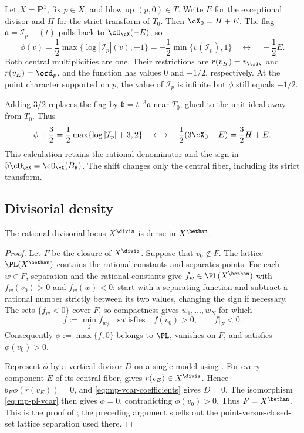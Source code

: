 \begin{example}\label{ex:mp-pl-flag-denominator}
Let $X=\mathbf P^1$, fix $p\in X$, and blow up
$(p,0)\in T$. Write $E$ for the exceptional divisor and
$H$ for the strict transform of $T_0$. Then
$\cX_0=H+E$. The flag
$\mathfrak a=\mathcal I_p+(t)$ pulls back to
$\cO_{\cX}(-E)$, so
\[
 \phi(v)=\frac12\max\{\log|\mathcal I_p|(v),-1\}
        =-\frac12\min\{v(\mathcal I_p),1\}
 \quad\longleftrightarrow\quad -\frac12E.
\]
Both central multiplicities are one. Their restrictions are
$r(v_H)=v_{\triv}$ and $r(v_E)=\ord_p$, and the function
has values $0$ and $-1/2$, respectively. At the point
character supported on $p$, the value of $\mathcal I_p$
is infinite but $\phi$ still equals $-1/2$.

Adding $3/2$ replaces the flag by
$\mathfrak b=t^{-3}\mathfrak a$ near $T_0$, glued to
the unit ideal away from $T_0$. Thus
\[
 \phi+\frac32
   =\frac12\max\{\log|\mathcal I_p|+3,2\}
 \quad\longleftrightarrow\quad
 \frac12(3\cX_0-E)=\frac32H+E.
\]
This calculation retains the rational denominator and the
sign in $\mathfrak b\cO_{\cX}=\cO_{\cX}(B_{\mathfrak b})$.
The shift changes only the central fiber, including its
strict transform.
\end{example}
\subsection{Divisorial density}
\label{subsec:mp-dual-density}

\begin{theorem}\label{thm:mp-divisorial-density}
The rational divisorial locus $X^{\divis}$ is dense in
$X^{\bethan}$.
\end{theorem}

\begin{proof}
Let $F$ be the closure of $X^{\divis}$.  Suppose that
$v_0\notin F$.  The lattice $\PL(X^{\bethan})$ contains the rational constants
and separates points.  For each $w\in F$, separation and the rational
constants give $f_w\in\PL(X^{\bethan})$ with
$f_w(v_0)>0$ and $f_w(w)<0$: start with a separating function and
subtract a rational number strictly between its two values, changing the
sign if necessary.  The sets $\{f_w<0\}$ cover $F$, so
compactness gives $w_1,\ldots,w_N$ for which
\[
 f:=\min_j f_{w_j}\quad\text{satisfies}\quad
 f(v_0)>0,\qquad f|_F<0.
\]
Consequently $\phi:=\max\{f,0\}$ belongs to $\PL$, vanishes on
$F$, and satisfies $\phi(v_0)>0$.

Represent $\phi$ by a vertical divisor $D$ on a single model using
.  For every component $E$ of its central fiber,
 gives
$r(v_E)\in X^{\divis}$.  Hence
$b_E\phi(r(v_E))=0$, and
\eqref{eq:mp-vcar-coefficients} gives $D=0$.  The isomorphism
\eqref{eq:mp-pl-vcar} then gives $\phi=0$, contradicting
$\phi(v_0)>0$.  Thus $F=X^{\bethan}$.  This is the proof of
\cite[Theorem~2.3.6, pp.~18 and~28]{MPTropicalV2}; the preceding argument spells out the
point-versus-closed-set lattice separation used there.
\end{proof}

